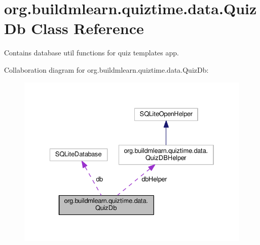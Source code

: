 \hypertarget{classorg_1_1buildmlearn_1_1quiztime_1_1data_1_1QuizDb}{}\section{org.\+buildmlearn.\+quiztime.\+data.\+Quiz\+Db Class Reference}
\label{classorg_1_1buildmlearn_1_1quiztime_1_1data_1_1QuizDb}


Contains database util functions for quiz template\textquotesingle{}s app.  




Collaboration diagram for org.\+buildmlearn.\+quiztime.\+data.\+Quiz\+Db\+:
\nopagebreak
\begin{figure}[H]
\begin{center}
\leavevmode
\includegraphics[width=334pt]{classorg_1_1buildmlearn_1_1quiztime_1_1data_1_1QuizDb__coll__graph}
\end{center}
\end{figure}
